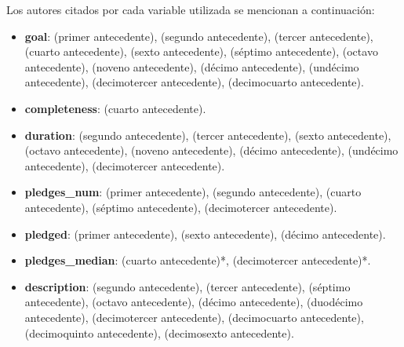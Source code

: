Los autores citados por cada variable utilizada se mencionan a continuación:
\begin{itemize}
	\item \textbf{goal}: \citeauthor{pr_chen2013kickpredict} (primer antecedente), \citeauthor{pr_mitra2014phrases} (segundo antecedente), \citeauthor{pr_zhou2015projectdesc} (tercer antecedente), \citeauthor{pr_chen2015predcrowd} (cuarto antecedente), \citeauthor{pr_li2016predcrowd} (sexto antecedente), \citeauthor{pr_yuan2016textanalytics} (séptimo antecedente), \citeauthor{pr_sawhney2016usingLT} (octavo antecedente), \citeauthor{pr_kaur2017socmedcrowd} (noveno antecedente), \citeauthor{pr_kamath2018suplearn} (décimo antecedente), \citeauthor{pr_yu2018deeplearning} (undécimo antecedente), \citeauthor{pr_jin2019dayssuccess} (decimotercer antecedente), \citeauthor{pr_cheng2019deeplearning} (decimocuarto antecedente).
	\item \textbf{completeness}: \citeauthor{pr_chen2015predcrowd} (cuarto antecedente).
	\item \textbf{duration}: \citeauthor{pr_mitra2014phrases} (segundo antecedente), \citeauthor{pr_zhou2015projectdesc} (tercer antecedente), \citeauthor{pr_li2016predcrowd} (sexto antecedente), \citeauthor{pr_sawhney2016usingLT} (octavo antecedente), \citeauthor{pr_kaur2017socmedcrowd} (noveno antecedente), \citeauthor{pr_kamath2018suplearn} (décimo antecedente), \citeauthor{pr_yu2018deeplearning} (undécimo antecedente), \citeauthor{pr_jin2019dayssuccess} (decimotercer antecedente).
	\item \textbf{pledges\_num}: \citeauthor{pr_chen2013kickpredict} (primer antecedente), \citeauthor{pr_mitra2014phrases} (segundo antecedente), \citeauthor{pr_chen2015predcrowd} (cuarto antecedente), \citeauthor{pr_yuan2016textanalytics} (séptimo antecedente), \citeauthor{pr_jin2019dayssuccess} (decimotercer antecedente).
	\item \textbf{pledged}: \citeauthor{pr_chen2013kickpredict} (primer antecedente), \citeauthor{pr_li2016predcrowd} (sexto antecedente), \citeauthor{pr_kamath2018suplearn} (décimo antecedente).
	\item \textbf{pledges\_median}: \citeauthor{pr_chen2015predcrowd} (cuarto antecedente)*, \citeauthor{pr_jin2019dayssuccess} (decimotercer antecedente)*.
	\item \textbf{description}: \citeauthor{pr_mitra2014phrases} (segundo antecedente), \citeauthor{pr_zhou2015projectdesc} (tercer antecedente), \citeauthor{pr_yuan2016textanalytics} (séptimo antecedente), \citeauthor{pr_sawhney2016usingLT} (octavo antecedente), \citeauthor{pr_kamath2018suplearn} (décimo antecedente), \citeauthor{pr_lee2018contentDL} (duodécimo antecedente), \citeauthor{pr_jin2019dayssuccess} (decimotercer antecedente), \citeauthor{pr_cheng2019deeplearning} (decimocuarto antecedente), \citeauthor{pr_chen2019keywords_crowdfunding} (decimoquinto antecedente), \citeauthor{pr_chaichi2019nlp_3dprinting} (decimosexto antecedente).

\end{itemize}
